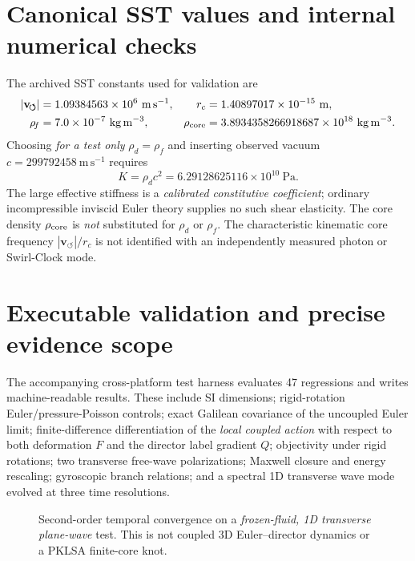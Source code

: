 \documentclass[11pt,a4paper]{article}
\newcommand{\rhoF}{\rho_{\!f}}
\newcommand{\rhoD}{\rho_{\!d}}
\newcommand{\rc}{r_c}
\newcommand{\vswirl}{\mathbf{v}_{\!\boldsymbol{\circlearrowleft}}}
\begin{document}
\section{Canonical SST values and internal numerical checks}
The archived SST constants used for validation are
\begin{align}
|\vswirl|&=1.09384563\times10^6\ \mathrm{m\,s^{-1}},&
\rc&=1.40897017\times10^{-15}\ \mathrm{m},\\
\rhoF&=7.0\times10^{-7}\ \mathrm{kg\,m^{-3}},&
\rho_{\rm core}&=3.8934358266918687\times10^{18}\ \mathrm{kg\,m^{-3}}.
\end{align}
Choosing \emph{for a test only} $\rhoD=\rhoF$ and inserting observed vacuum $c=299792458\ \mathrm{m\,s^{-1}}$ requires
\begin{equation}
\boxed{K=\rhoD c^2=6.29128625116\times10^{10}\ \mathrm{Pa}.}
\label{eq:numerical}
\end{equation}
The large effective stiffness is a \emph{calibrated constitutive coefficient}; ordinary incompressible inviscid Euler theory supplies no such shear elasticity. The core density $\rho_{\rm core}$ is \emph{not} substituted for $\rhoD$ or $\rhoF$. The characteristic kinematic core frequency $|\vswirl|/\rc$ is not identified with an independently measured photon or Swirl-Clock mode.

\section{Executable validation and precise evidence scope}
The accompanying cross-platform test harness evaluates 47 regressions and writes machine-readable results. These include SI dimensions; rigid-rotation Euler/pressure-Poisson controls; exact Galilean covariance of the uncoupled Euler limit; finite-difference differentiation of the \emph{local coupled action} with respect to both deformation $F$ and the director label gradient $Q$; objectivity under rigid rotations; two transverse free-wave polarizations; Maxwell closure and energy rescaling; gyroscopic branch relations; and a spectral 1D transverse wave mode evolved at three time resolutions.

\begin{figure}[h]
\centering
{}
\caption{Second-order temporal convergence on a \emph{frozen-fluid, 1D transverse plane-wave} test. This is not coupled 3D Euler--director dynamics or a PKLSA finite-core knot.}
\end{figure}
\end{document}
